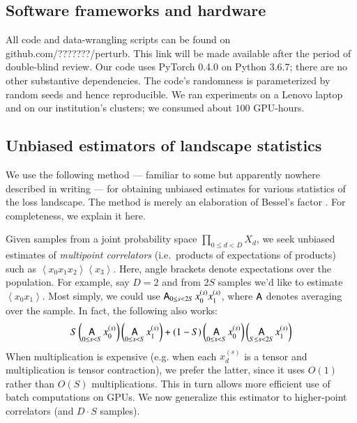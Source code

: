 \documentclass[anon,12pt]{colt2021} %
\newcommand{\wrap}[1]{\left(#1\right)}
\newcommand{\wang}[1]{\left\langle#1\right\rangle}
\DeclareMathOperator*{\Avg}{\text{\sffamily A}}
\begin{document}
{    \subsection{Software frameworks and hardware}                   \label{appendix:frameworks}

        All code and data-wrangling scripts can be found on
        {\color{mooteal}github.com/???????/perturb}.  This link will be made
        available after the period of double-blind review.
        Our code uses PyTorch 0.4.0 \citep{pa19} on Python 3.6.7; there are no
        other substantive dependencies.  The code's randomness is parameterized
        by random seeds and hence reproducible.
        We ran experiments on a Lenovo laptop and on our institution's
        clusters; we consumed about $100$ GPU-hours.

    \subsection{Unbiased estimators of landscape statistics}        \label{appendix:bessel}
        We use the following method --- familiar to some but apparently nowhere
        described in writing --- for obtaining unbiased estimates for
        various statistics of the loss landscape.  The method is merely an
        elaboration of Bessel's factor \citep{ga23}.  For completeness, we
        explain it here. 
        
        Given samples from a joint probability space $\prod_{0\leq d<D} X_d$,
        we seek unbiased estimates of \emph{multipoint correlators} (i.e.\ products of
        expectations of products) such as $\wang{x_0 x_1 x_2}\wang{x_3}$.  Here,
        angle brackets denote expectations over the population. 
        For
        example, say $D=2$ and from $2S$ samples we'd like to estimate
        $\wang{x_0 x_1}$.  Most simply, we could use $\Avg_{0\leq s<2S}
        x_0^{(s)} x_1^{(s)}$, where $\Avg$ denotes averaging over the sample.  In fact, the
        following also works:
        \begin{equation} \label{eq:bessel}
            S
            \wrap{\Avg_{0\leq s< S} x_0^{(s)}}
            \wrap{\Avg_{0\leq s< S} x_1^{(s)}}
            +
            (1-S)
            \wrap{\Avg_{0\leq s< S} x_0^{(s)}}
            \wrap{\Avg_{S\leq s<2S} x_1^{(s)}}
        \end{equation}
        When multiplication is expensive (e.g. when each $x_d^{(s)}$ is a
        tensor and multiplication is tensor contraction), we prefer the latter,
        since it uses $O(1)$ rather than $O(S)$ multiplications.  This in turn
        allows more efficient use of batch computations on GPUs.  We now
        generalize this estimator to higher-point correlators (and $D\cdot S$
        samples).

}
\end{document}
